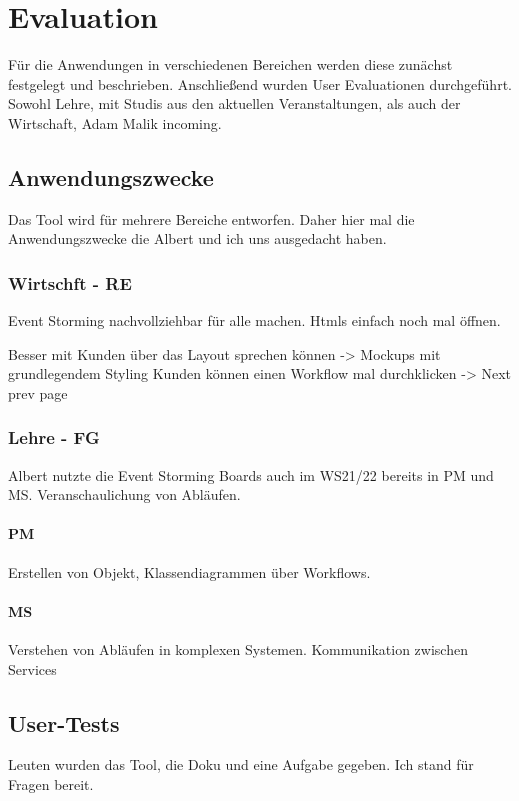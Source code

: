\chapter{Evaluation}\label{ch:evaluation}
Für die Anwendungen in verschiedenen Bereichen werden diese zunächst festgelegt und beschrieben.
Anschließend wurden User Evaluationen durchgeführt.
Sowohl Lehre, mit Studis aus den aktuellen Veranstaltungen, als auch der Wirtschaft, Adam Malik incoming.

\section{Anwendungszwecke}\label{sec:anwendungszwecke}
Das Tool wird für mehrere Bereiche entworfen.
Daher hier mal die Anwendungszwecke die Albert und ich uns ausgedacht haben.

\subsection{Wirtschft - RE}\label{subsec:wirtschft---re}
Event Storming nachvollziehbar für alle machen.
Htmls einfach noch mal öffnen.

Besser mit Kunden über das Layout sprechen können -> Mockups mit grundlegendem Styling
Kunden können einen Workflow mal durchklicken -> Next prev page

\subsection{Lehre - FG}\label{subsec:lehre---fg}
Albert nutzte die Event Storming Boards auch im WS21/22 bereits in PM und MS.
Veranschaulichung von Abläufen.

\subsubsection{PM}
Erstellen von Objekt, Klassendiagrammen über Workflows.

\subsubsection{MS}
Verstehen von Abläufen in komplexen Systemen.
Kommunikation zwischen Services

\section{User-Tests}\label{sec:user-tests}
Leuten wurden das Tool, die Doku und eine Aufgabe gegeben.
Ich stand für Fragen bereit.

